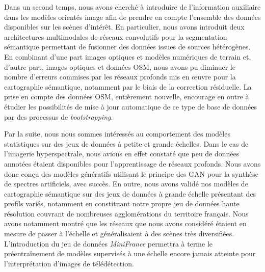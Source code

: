 Dans un second temps, nous avons cherché à introduire de l'information auxiliaire dans les modèles orientés image afin de prendre en compte l'ensemble des données disponibles sur les scènes d'intérêt. En particulier, nous avons introduit deux architectures multimodales de réseaux convolutifs pour la segmentation sémantique permettant de fusionner des données issues de sources hétérogènes. En combinant d'une part images optiques et modèles numériques de terrain et, d'autre part, images optiques et données \glsdesc{OSM}, nous avons pu diminuer le nombre d'erreurs commises par les réseaux profonds mis en \oe{}uvre pour la cartographie sémantique, notamment par le biais de la correction résiduelle. La prise en compte des données \gls{OSM}, entièrement nouvelle, encourage en outre à étudier les possibilités de mise à jour automatique de ce type de base de données par des processus de \emph{bootstrapping}.

Par la suite, nous nous sommes intéressés au comportement des modèles statistiques sur des jeux de données à petite et grande échelles. Dans le cas de l'imagerie hyperspectrale, nous avions en effet constaté que peu de données annotées étaient disponibles pour l'apprentissage de réseaux profonds. Nous avons donc conçu des modèles génératifs utilisant le principe des \gls{GAN} pour la synthèse de spectres artificiels, avec succès. En outre, nous avons validé nos modèles de cartographie sémantique sur des jeux de données à grande échelle présentant des profils variés, notamment en constituant notre propre jeu de données haute résolution couvrant de nombreuses agglomérations du territoire français. Nous avons notamment montré que les réseaux que nous avons considéré étaient en mesure de passer à l'échelle et généralisaient à des scènes très diversifiées. L'introduction du jeu de données \emph{MiniFrance} permettra à terme le préentraînement de modèles supervisés à une échelle encore jamais atteinte pour l'interprétation d'images de télédétection.


